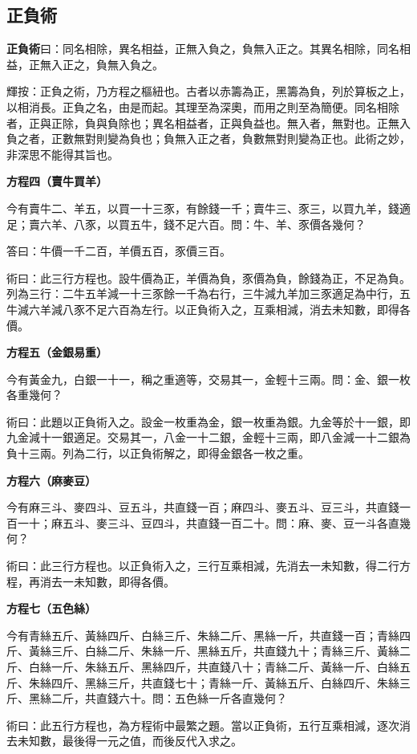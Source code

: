\documentclass[11pt,a4paper]{article}
\newenvironment{problemenv}[1]{%
  \medskip\noindent\textbf{#1}\par\nopagebreak\smallskip
}{\medskip}
\begin{document}
\subsection{正負術}

\textbf{正負術}曰：同名相除，異名相益，正無入負之，負無入正之。其異名相除，同名相益，正無入正之，負無入負之。

輝按：正負之術，乃方程之樞紐也。古者以赤籌為正，黑籌為負，列於算板之上，以相消長。正負之名，由是而起。其理至為深奧，而用之則至為簡便。同名相除者，正與正除，負與負除也；異名相益者，正與負益也。無入者，無對也。正無入負之者，正數無對則變為負也；負無入正之者，負數無對則變為正也。此術之妙，非深思不能得其旨也。

\begin{problemenv}{方程四（賣牛買羊）}
今有賣牛二、羊五，以買一十三豕，有餘錢一千；賣牛三、豕三，以買九羊，錢適足；賣六羊、八豕，以買五牛，錢不足六百。問：牛、羊、豕價各幾何？

\textsf{答曰：}牛價一千二百，羊價五百，豕價三百。

\textsf{術曰：}此三行方程也。設牛價為正，羊價為負，豕價為負，餘錢為正，不足為負。列為三行：二牛五羊減一十三豕餘一千為右行，三牛減九羊加三豕適足為中行，五牛減六羊減八豕不足六百為左行。以正負術入之，互乘相減，消去未知數，即得各價。
\end{problemenv}

\begin{problemenv}{方程五（金銀易重）}
今有黃金九，白銀一十一，稱之重適等，交易其一，金輕十三兩。問：金、銀一枚各重幾何？

\textsf{術曰：}此題以正負術入之。設金一枚重為金，銀一枚重為銀。九金等於十一銀，即九金減十一銀適足。交易其一，八金一十二銀，金輕十三兩，即八金減一十二銀為負十三兩。列為二行，以正負術解之，即得金銀各一枚之重。
\end{problemenv}

\begin{problemenv}{方程六（麻麥豆）}
今有麻三斗、麥四斗、豆五斗，共直錢一百；麻四斗、麥五斗、豆三斗，共直錢一百一十；麻五斗、麥三斗、豆四斗，共直錢一百二十。問：麻、麥、豆一斗各直幾何？

\textsf{術曰：}此三行方程也。以正負術入之，三行互乘相減，先消去一未知數，得二行方程，再消去一未知數，即得各價。
\end{problemenv}

\begin{problemenv}{方程七（五色絲）}
今有青絲五斤、黃絲四斤、白絲三斤、朱絲二斤、黑絲一斤，共直錢一百；青絲四斤、黃絲三斤、白絲二斤、朱絲一斤、黑絲五斤，共直錢九十；青絲三斤、黃絲二斤、白絲一斤、朱絲五斤、黑絲四斤，共直錢八十；青絲二斤、黃絲一斤、白絲五斤、朱絲四斤、黑絲三斤，共直錢七十；青絲一斤、黃絲五斤、白絲四斤、朱絲三斤、黑絲二斤，共直錢六十。問：五色絲一斤各直幾何？

\textsf{術曰：}此五行方程也，為方程術中最繁之題。當以正負術，五行互乘相減，逐次消去未知數，最後得一元之值，而後反代入求之。
\end{problemenv}
\end{document}
